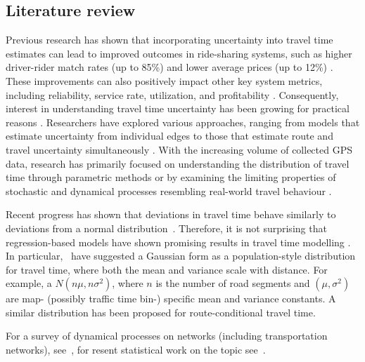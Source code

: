 \documentclass[12pt]{article}
\begin{document}
\subsection{Literature review}
\label{literature}
Previous research has shown that incorporating uncertainty into travel time estimates can lead to improved outcomes in ride-sharing systems, such as higher driver-rider match rates (up to 85\%) and lower average prices (up to 12\%) \citep{long2018ride}. These improvements can also positively impact other key system metrics, including reliability, service rate, utilization, and profitability \citep{li2021vehicle, li2022pricing,li2022ride}. Consequently, interest in understanding travel time uncertainty has been growing for practical reasons \citep{westgate2013travel,wang2019simple, hunter2009path,westgate2016large}.  Researchers have explored various approaches, ranging from models that estimate uncertainty from individual edges \citep{zheng2013urban,jenelius2013travel} to those that estimate route and travel uncertainty simultaneously \citep{westgate2013travel,wang2019simple, hunter2009path,westgate2016large}. With the increasing volume of collected GPS data, research has primarily focused on understanding the distribution of travel time through parametric methods \citep{woodard2017predicting,guo2012multistate,ma2017estimation,zhang2019novel} or by examining the limiting properties of stochastic and dynamical processes resembling real-world travel behaviour \cite{elmasri2020predictive, bolin2022gaussian}.

Recent progress has shown that deviations in travel time behave similarly to deviations from a normal distribution~\cite{elmasri2020predictive, woodard2017predicting}. Therefore, it is not surprising that regression-based models have shown promising results in travel time modelling \citep{westgate2016large, woodard2017predicting,budge2010empirical, westgate2013travel}. In particular,~\cite{elmasri2020predictive} have suggested a Gaussian form as a population-style distribution for travel time, where both the mean and variance scale with distance. For example, a \(N(n\mu, n\sigma^{2})\), where \(n\) is the number of road segments and \((\mu, \sigma^{2})\) are map- (possibly traffic time bin-) specific mean and variance constants. A similar distribution has been proposed for route-conditional travel time. 

For a survey of dynamical processes on networks (including transportation networks), see~\citet[ch. 11]{barrat2008dynamical}, for resent statistical work on the topic see~\citep{kolaczyk2014statistical, snijders2017modeling,burk2007beyond, britton2002bayesian,golightly2005bayesian, bolin2022gaussian}. 
\end{document}
